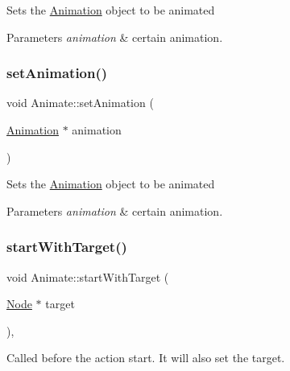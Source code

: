 Sets the \hyperlink{classAnimation}{Animation} object to be animated


\begin{DoxyParams}{Parameters}
{\em animation} & certain animation. \\
\hline
\end{DoxyParams}
\mbox{\label{classAnimate_a041aefb7a2f9398a962bb9b37888af05}} 
\subsubsection{\texorpdfstring{set\+Animation()}{setAnimation()}\hspace{0.1cm}{\footnotesize\ttfamily [2/2]}}
{\footnotesize\ttfamily void Animate\+::set\+Animation (\begin{DoxyParamCaption}\item[{\hyperlink{classAnimation}{Animation} $\ast$}]{animation }\end{DoxyParamCaption})}

Sets the \hyperlink{classAnimation}{Animation} object to be animated


\begin{DoxyParams}{Parameters}
{\em animation} & certain animation. \\
\hline
\end{DoxyParams}
\mbox{\label{classAnimate_ad9c0defb552a4bd8bfbc4d9dad96c59b}} 
\subsubsection{\texorpdfstring{start\+With\+Target()}{startWithTarget()}\hspace{0.1cm}{\footnotesize\ttfamily [1/2]}}
{\footnotesize\ttfamily void Animate\+::start\+With\+Target (\begin{DoxyParamCaption}\item[{\hyperlink{classNode}{Node} $\ast$}]{target }\end{DoxyParamCaption})\hspace{0.3cm}{\ttfamily [override]}, {\ttfamily [virtual]}}

Called before the action start. It will also set the target.



